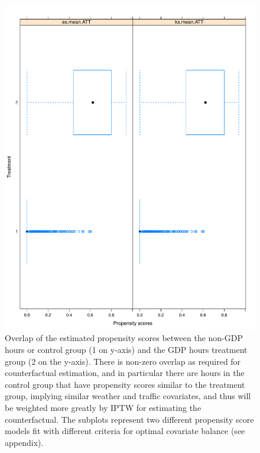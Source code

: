 \documentclass[conference]{IEEEtran}
\begin{document}
\begin{figure}[!t]
\centering
\includegraphics[scale=0.25]{./figs/psoverlap}
\caption{Overlap of the estimated propensity scores between the non-GDP hours or control group (1 on y-axis) and the GDP hours treatment group (2 on the y-axis).  There is non-zero overlap as required for counterfactual estimation, and in particular there are hours in the control group that have propensity scores similar to the treatment group, implying similar weather and traffic covariates, and thus will be weighted more greatly by IPTW for estimating the counterfactual.  The subplots represent two different propensity score models fit with different criteria for optimal covariate balance (see appendix).}
\label{psoverlap}
\end{figure}
 
\end{document}
